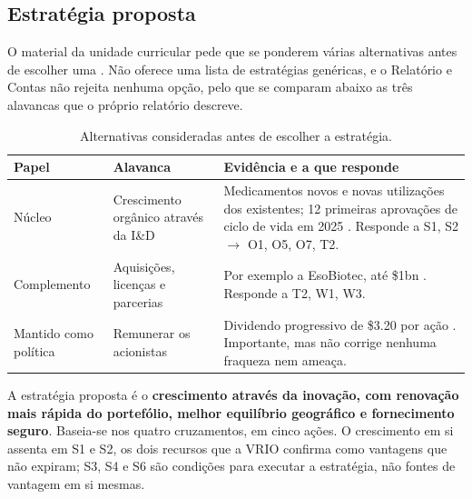 \subsection{Estratégia proposta}
O material da unidade curricular pede que se ponderem várias alternativas antes de escolher uma \cite[pp.~3, 7, 29]{PLAN}. Não oferece uma lista de estratégias genéricas, e o Relatório e Contas não rejeita nenhuma opção, pelo que se comparam abaixo as três alavancas que o próprio relatório descreve.

\begin{table}[H]\centering
\caption{Alternativas consideradas antes de escolher a estratégia.}
\label{tab:alternativas}
\begin{tabularx}{\linewidth}{@{}lp{3.5cm}Y@{}}
\toprule
\textbf{Papel} & \textbf{Alavanca} & \textbf{Evidência e a que responde} \\
\midrule
Núcleo & Crescimento orgânico através da I\&D & Medicamentos novos e novas utilizações dos existentes; 12 primeiras aprovações de ciclo de vida em 2025 \cite[pp.~4, 52]{AR}. Responde a S1, S2 $\rightarrow$ O1, O5, O7, T2. \\
\addlinespace
Complemento & Aquisições, licenças e parcerias & Por exemplo a EsoBiotec, até \$1bn \cite[pp.~37, 48]{AR}. Responde a T2, W1, W3. \\
\addlinespace
Mantido como política & Remunerar os acionistas & Dividendo progressivo de \$3.20 por ação \cite[pp.~3, 10]{AR}. Importante, mas não corrige nenhuma fraqueza nem ameaça. \\
\bottomrule
\end{tabularx}
\end{table}
A estratégia proposta é o \textbf{crescimento através da inovação, com renovação mais rápida do portefólio, melhor equilíbrio geográfico e fornecimento seguro}. Baseia-se nos quatro cruzamentos, em cinco ações. O crescimento em si assenta em S1 e S2, os dois recursos que a VRIO confirma como vantagens que não expiram; S3, S4 e S6 são condições para executar a estratégia, não fontes de vantagem em si mesmas.

